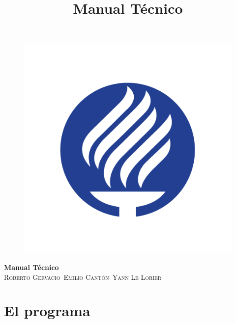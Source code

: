 \documentclass[12pt]{amsart}
\title{Manual T\'ecnico}
\author{}
\date{}
\begin{document}
\begin{titlepage}
	\begin{center}
		\begin{figure}
			\includegraphics[width=\linewidth]{Tec.jpg}
			\label{fig:Tec}
		\end{figure}
	\huge{\bfseries{Manual T\'ecnico}}\\
	\textsc{\small{Roberto Gervacio}}\
	\textsc{\small{Emilio Cant\'on}}\
	\textsc{\small{Yann Le Lorier}}\
	\end{center}
\end{titlepage}
\maketitle
\tableofcontents

\section{El programa}
\subsection{}
\end{document}
